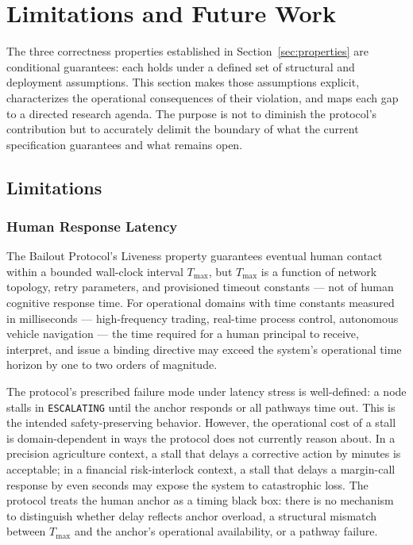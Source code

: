 \section{Limitations and Future Work}\label{sec:limitations}

The three correctness properties established in Section~\ref{sec:properties} are
conditional guarantees: each holds under a defined set of structural and
deployment assumptions.  This section makes those assumptions explicit,
characterizes the operational consequences of their violation, and maps each
gap to a directed research agenda.  The purpose is not to diminish the
protocol's contribution but to accurately delimit the boundary of what the
current specification guarantees and what remains open.

\subsection{Limitations}\label{sec:limitations:subsection}

\subsubsection{Human Response Latency}\label{sec:human-response-latency}

The Bailout Protocol's Liveness property guarantees eventual human contact
within a bounded wall-clock interval $T_{\max}$, but $T_{\max}$ is a function
of network topology, retry parameters, and provisioned timeout constants --- not
of human cognitive response time.  For operational domains with time constants
measured in milliseconds --- high-frequency trading, real-time process control,
autonomous vehicle navigation --- the time required for a human principal to
receive, interpret, and issue a binding directive may exceed the system's
operational time horizon by one to two orders of magnitude.

The protocol's prescribed failure mode under latency stress is well-defined: a
node stalls in \texttt{ESCALATING} until the anchor responds or all pathways
time out.  This is the intended safety-preserving behavior.  However, the
operational cost of a stall is domain-dependent in ways the protocol does not
currently reason about.  In a precision agriculture context, a stall that
delays a corrective action by minutes is acceptable; in a financial
risk-interlock context, a stall that delays a margin-call response by even
seconds may expose the system to catastrophic loss.  The protocol treats the
human anchor as a timing black box: there is no mechanism to distinguish
whether delay reflects anchor overload, a structural mismatch between
$T_{\max}$ and the anchor's operational availability, or a pathway failure.

